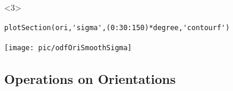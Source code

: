 \documentclass[compress]{beamer}
\begin{document}
\begin{frame}[fragile]
    \begin{onlyenv}<3>
    \begin{lstlisting}[style=input]
plotSection(ori,'sigma',(0:30:150)*degree,'contourf')
    \end{lstlisting}
    \vspace{-0.3cm}
    \begin{center}
      \texttt{[image: pic/odfOriSmoothSigma]}
    \end{center}

  \end{onlyenv}

\end{frame}

\subsection*{Operations on Orientations}
\end{document}
